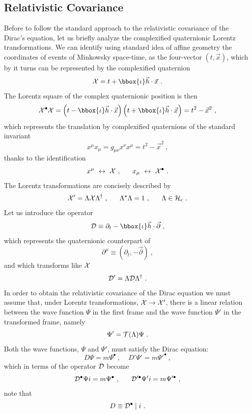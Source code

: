 \subsection{Relativistic Covariance}
\label{s42}

Before to follow the standard approach to the relativistic covariance of
the Dirac's equation, let
us briefly analyze the complexified quaternionic Lorentz transformations.
We can identify using standard idea of affine geometry the coordinates of 
events of Minkowsky space-time, as 
the four-vector $\left(t,\vec{x} \right)$, which by it turns can be 
represented by the complexified quaternion
\[ {\cal X} = t + \bbox{\iota} \vec{h} \cdot \vec{x}~. \]
The Lorentz square of the complex quaternionic position is then
\[  {\cal X}^{\bullet} {\cal X} = 
\left (t - \bbox{\iota} \vec{h} \cdot \vec{x} \right)
\left (t + \bbox{\iota} \vec{h} \cdot \vec{x} \right)
= t^2 - \vec{x}^2~,\]
which represents the translation by complexified quaternions of the 
standard invariant
\[ x^{\mu} x_{\mu} = g_{\mu \nu} x^{\nu} x^{\mu} = t^2 - \vec{x}^{2}~, \]
thanks to the identification 
\[ x^{\mu} ~\leftrightarrow~{\cal X}~,~~~~~
   x_{\mu} ~\leftrightarrow~{\cal X}^{\bullet}~.\]
The Lorentz transformations are concisely described by 
\[ {\cal X}' = \Lambda {\cal X} \Lambda^{\dag}~,
   ~~~~~\Lambda^{\star} \Lambda = 1~,
   ~~~~~\Lambda \in {\cal H}_c~.
\]
Let us introduce the operator
\begin{equation}
{\cal D} \equiv \partial_t - \bbox{\iota} \vec{h} \cdot \vec{\partial}~,
\end{equation}
which represents the quaternionic counterpart of
\[ \partial^{\mu} \equiv \left( \partial_t, - \vec{\partial} \right)~, \]
and which transforms like $\cal X$
\[ {\cal D}' = \Lambda {\cal D} \Lambda^{\dag}~.\]
In order to obtain the relativistic covariance of the Dirac equation  
we must assume that, under 
Lorentz transformations, ${\cal X} \rightarrow {\cal X}'$, 
there is a linear relation between the wave function $\Psi$ in the first 
frame and the wave function $\Psi'$ in the transformed frame, namely
\begin{equation}
\Psi' = {\cal T}(\Lambda) \Psi~.
\end{equation}
Both the wave functions, $\Psi$ and $\Psi'$, 
must satisfy the Dirac equation:
\[ D \Psi = m \Psi^{\bullet}~,~~~~~
   D' \Psi' = m \Psi'^{\bullet}~,
\]
which in terms of the operator $\cal D$ become
\[ {\cal D}^{\bullet} \Psi i = m \Psi^{\bullet}~,~~~~~
   {\cal D}'^{\bullet} \Psi' i = m \Psi'^{\bullet}~,
\]
note that
\[ D \equiv {\cal D}^{\bullet} \mid i~. \]
